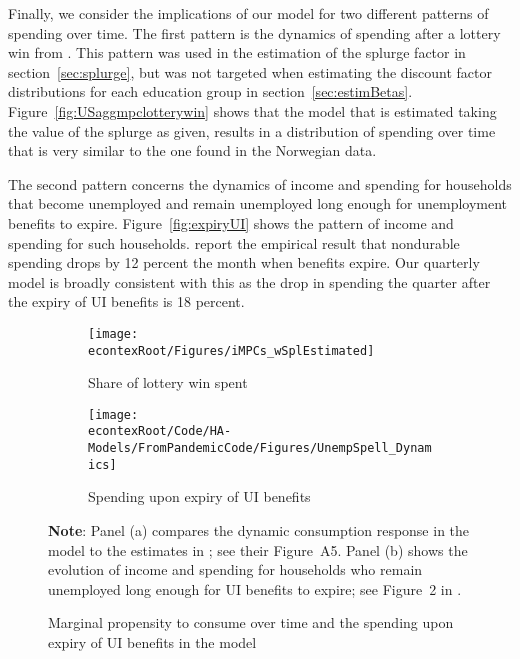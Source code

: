 \documentclass[\econtexRoot/HAFiscal]{subfiles}
\begin{document}
Finally, we consider the implications of our model for two different patterns of spending over time.
The first pattern is the dynamics of spending after a lottery win from \citeauthor{fagereng_mpc_2021}.
This pattern was used in the estimation of the splurge factor in section~\ref{sec:splurge}, but was not targeted when estimating the discount factor distributions for each education group in section~\ref{sec:estimBetas}.
Figure~\ref{fig:USaggmpclotterywin} shows that the model that is estimated taking the value of the splurge as given, results in a distribution of spending over time that is very similar to the one found in the Norwegian data.

\hypertarget{ganong-noel}{}

The second pattern concerns the dynamics of income and spending for households that become unemployed and remain unemployed long enough for unemployment benefits to expire.
Figure~\ref{fig:expiryUI} shows the pattern of income and spending for such households.
\citet{ganongConsumer2019} report the empirical result that nondurable spending drops by 12 percent the month when benefits expire.
Our quarterly model is broadly consistent with this as the drop in spending the quarter after the expiry of UI benefits is 18 percent.

\begin{figure}[htb]
    \centering
    \begin{subfigure}[b]{.48\linewidth}
        \centering
        \texttt{[image: \\econtexRoot/Figures/iMPCs\_wSplEstimated]}
        \caption{Share of lottery win spent}
        \notinsubfile{\label{fig:USaggmpclotterywin}}
    \end{subfigure}%
    \begin{subfigure}[b]{.48\linewidth}
        \centering
        \texttt{[image: \\econtexRoot/Code/HA-Models/FromPandemicCode/Figures/UnempSpell\_Dynamics]}
        \caption{Spending upon expiry of UI benefits}
        \notinsubfile{\label{fig:expiryUI}}
    \end{subfigure}
    \caption{Marginal propensity to consume over time and the spending upon expiry of UI benefits in the model}
    \notinsubfile{\label{fig:untargetedMoments}}
\begin{minipage}{16cm}
\small \vspace{.15cm} \textbf{Note}: Panel (a) compares the dynamic consumption response in the model to the estimates in {\citet{fagereng_mpc_2021}}; see their Figure~A5.
Panel (b) shows the evolution of income and spending for households who remain unemployed long enough for UI benefits to expire; see Figure~2 in {\citet{ganongConsumer2019}}.\normalsize
\end{minipage}
  \end{figure}
  
\end{document}
